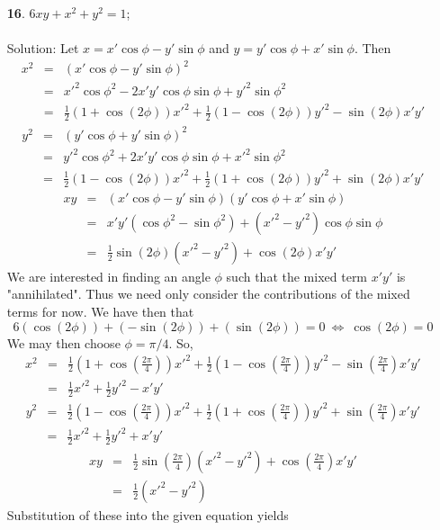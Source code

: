\documentclass[12pt]{amsbook}
\begin{document}
\begin{enumerate}
\item[{\small\bf 16}.]\quad  $6xy+x^2+y^2=1$;
\\
\\
{\sc Solution}: Let $x=x'\cos\phi-y'\sin\phi$ and $y=y'\cos\phi+x'\sin\phi$. Then
\begin{eqnarray*}
x^2&=&(x'\cos\phi-y'\sin\phi)^2\\
&=&x'^2\cos\phi^2-2x'y'\cos\phi\sin\phi+y'^2\sin\phi^2\\
&=&\frac{1}{2}(1+\cos(2\phi))x'^2+\frac{1}{2}(1-\cos(2\phi))y'^2-\sin(2\phi)x'y'
\end{eqnarray*}
\begin{eqnarray*}
y^2&=&(y'\cos\phi+y'\sin\phi)^2\\
&=&y'^2\cos\phi^2+2x'y'\cos\phi\sin\phi+x'^2\sin\phi^2\\
&=&\frac{1}{2}(1-\cos(2\phi))x'^2+\frac{1}{2}(1+\cos(2\phi))y'^2+\sin(2\phi)x'y'
\end{eqnarray*}
\begin{eqnarray*}
xy&=&(x'\cos\phi-y'\sin\phi)(y'\cos\phi+x'\sin\phi)\\
&=&x'y'(\cos\phi^2-\sin\phi^2)+(x'^2-y'^2)\cos\phi\sin\phi\\
&=&\frac{1}{2}\sin(2\phi)(x'^2-y'^2)+\cos(2\phi)x'y'
\end{eqnarray*}
We are interested in finding an angle $\phi$ such that the mixed term $x'y'$ is "annihilated". Thus we need only consider the contributions of the mixed terms for now. We have then that
$$6(\cos(2\phi))+(-\sin(2\phi))+(\sin(2\phi))=0 \ \Leftrightarrow \ \cos(2\phi)=0$$
We may then choose $\phi=\pi/4$. So,
\begin{eqnarray*}
x^2&=&\frac{1}{2}(1+\cos(\frac{2\pi}{4}))x'^2+\frac{1}{2}(1-\cos(\frac{2\pi}{4}))y'^2-\sin(\frac{2\pi}{4})x'y'\\
&=&\frac{1}{2}x'^2+\frac{1}{2}y'^2-x'y'
\end{eqnarray*}
\begin{eqnarray*}
y^2&=&\frac{1}{2}(1-\cos(\frac{2\pi}{4}))x'^2+\frac{1}{2}(1+\cos(\frac{2\pi}{4}))y'^2+\sin(\frac{2\pi}{4})x'y'\\
&=&\frac{1}{2}x'^2+\frac{1}{2}y'^2+x'y'
\end{eqnarray*}
\begin{eqnarray*}
xy&=&\frac{1}{2}\sin(\frac{2\pi}{4})(x'^2-y'^2)+\cos(\frac{2\pi}{4})x'y'\\
&=&\frac{1}{2}(x'^2-y'^2)
\end{eqnarray*}
Substitution of these into the given equation yields

\end{enumerate}
\end{document}
